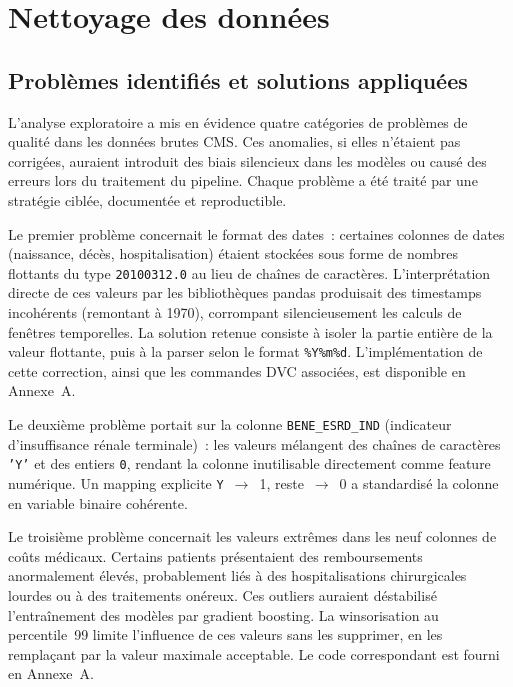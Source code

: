 \section{Nettoyage des données}

\subsection{Problèmes identifiés et solutions appliquées}

L'analyse exploratoire a mis en évidence quatre catégories de problèmes de qualité
dans les données brutes CMS. Ces anomalies, si elles n'étaient pas corrigées, auraient
introduit des biais silencieux dans les modèles ou causé des erreurs lors du traitement
du pipeline. Chaque problème a été traité par une stratégie ciblée, documentée et
reproductible.

Le premier problème concernait le format des dates~: certaines colonnes de dates
(naissance, décès, hospitalisation) étaient stockées sous forme de nombres flottants
du type \texttt{20100312.0} au lieu de chaînes de caractères. L'interprétation directe
de ces valeurs par les bibliothèques pandas produisait des timestamps incohérents
(remontant à 1970), corrompant silencieusement les calculs de fenêtres temporelles.
La solution retenue consiste à isoler la partie entière de la valeur flottante, puis
à la parser selon le format \texttt{\%Y\%m\%d}. L'implémentation de cette correction,
ainsi que les commandes DVC associées, est disponible en Annexe~A.

Le deuxième problème portait sur la colonne \texttt{BENE\_ESRD\_IND} (indicateur
d'insuffisance rénale terminale)~: les valeurs mélangent des chaînes de caractères
\texttt{'Y'} et des entiers \texttt{0}, rendant la colonne inutilisable directement
comme feature numérique. Un mapping explicite \texttt{Y}~$\rightarrow$~1, reste~$\rightarrow$~0
a standardisé la colonne en variable binaire cohérente.

Le troisième problème concernait les valeurs extrêmes dans les neuf colonnes de coûts
médicaux. Certains patients présentaient des remboursements anormalement élevés, probablement
liés à des hospitalisations chirurgicales lourdes ou à des traitements onéreux. Ces outliers
auraient déstabilisé l'entraînement des modèles par gradient boosting. La winsorisation au
percentile~99 limite l'influence de ces valeurs sans les supprimer, en les remplaçant par
la valeur maximale acceptable. Le code correspondant est fourni en Annexe~A.

